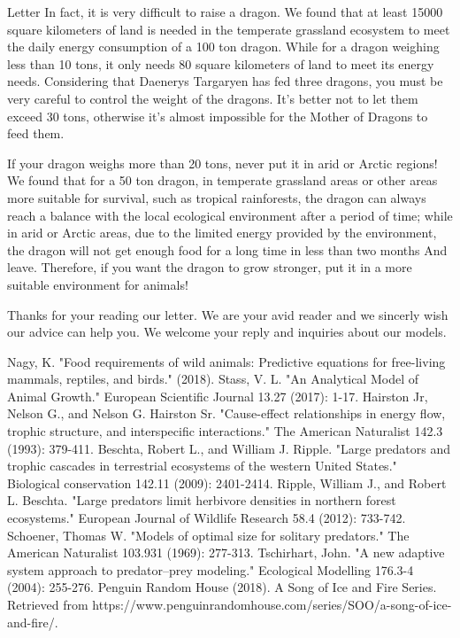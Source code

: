 \documentclass{mcmthesis}
\begin{document}
\begin{letter}{Letter}
In fact, it is very difficult to raise a dragon. We found that at least 15000 square kilometers of land is needed in the temperate grassland ecosystem to meet the daily energy consumption of a 100 ton dragon. While for a dragon weighing less than 10 tons, it only needs 80 square kilometers of land to meet its energy needs. Considering that Daenerys Targaryen has fed three dragons, you must be very careful to control the weight of the dragons. It's better not to let them exceed 30 tons, otherwise it's almost impossible for the Mother of Dragons to feed them.

If your dragon weighs more than 20 tons, never put it in arid or Arctic regions! We found that for a 50 ton dragon, in temperate grassland areas or other areas more suitable for survival, such as tropical rainforests, the dragon can always reach a balance with the local ecological environment after a period of time; while in arid or Arctic areas, due to the limited energy provided by the environment, the dragon will not get enough food for a long time in less than two months And leave.
Therefore, if you want the dragon to grow stronger, put it in a more suitable environment for animals!

Thanks for your reading our letter. We are your avid reader and we sincerly wish our advice can help you. We welcome your reply
and inquiries about our models.\\

\end{letter}

\newpage

\begin{thebibliography}{99}
 Nagy, K. "Food requirements of wild animals: Predictive equations for free-living mammals, reptiles, and birds." (2018).
 Stass, V. L. "An Analytical Model of Animal Growth." European Scientific Journal 13.27 (2017): 1-17.
 Hairston Jr, Nelson G., and Nelson G. Hairston Sr. "Cause-effect relationships in energy flow, trophic structure, and interspecific interactions." The American Naturalist 142.3 (1993): 379-411.
 Beschta, Robert L., and William J. Ripple. "Large predators and trophic cascades in terrestrial ecosystems of the western United States." Biological conservation 142.11 (2009): 2401-2414.
 Ripple, William J., and Robert L. Beschta. "Large predators limit herbivore densities in northern forest ecosystems." European Journal of Wildlife Research 58.4 (2012): 733-742.
 Schoener, Thomas W. "Models of optimal size for solitary predators." The American Naturalist 103.931 (1969): 277-313.
 Tschirhart, John. "A new adaptive system approach to predator–prey modeling." Ecological Modelling 176.3-4 (2004): 255-276.
 Penguin Random House (2018). A Song of Ice and Fire Series. Retrieved from https://www.penguinrandomhouse.com/series/SOO/a-song-of-ice-and-fire/.
\end{thebibliography}
\end{document}
